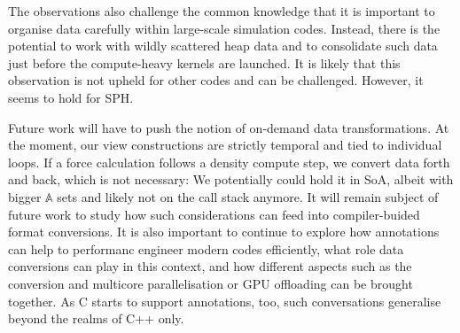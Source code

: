 The observations also challenge the common knowledge that it is important to organise data carefully within large-scale simulation codes.
Instead, there is the potential to work with wildly scattered heap data and to consolidate such data just before the compute-heavy kernels are launched.
It is likely that this observation is not upheld for other codes and can be challenged.
However, it seems to hold for SPH. 


Future work will have to push the notion of on-demand data transformations.
At the moment, our view constructions are strictly temporal and tied to individual loops.
If a force calculation follows a density compute step, we convert data forth and back, which is not necessary: 
We potentially could hold it in SoA, albeit with bigger $\mathbb{A}$ sets and likely not on the call stack anymore.
It will remain subject of future work to study how such considerations can feed into compiler-buided format conversions.
It is also important to continue to explore how annotations can help to performanc engineer modern codes efficiently, what role data conversions can play in this context, and how different aspects such as the conversion and multicore parallelisation or GPU offloading can be brought together.
As C starts to support annotations, too, such conversations generalise beyond the realms of C++ only.

 
